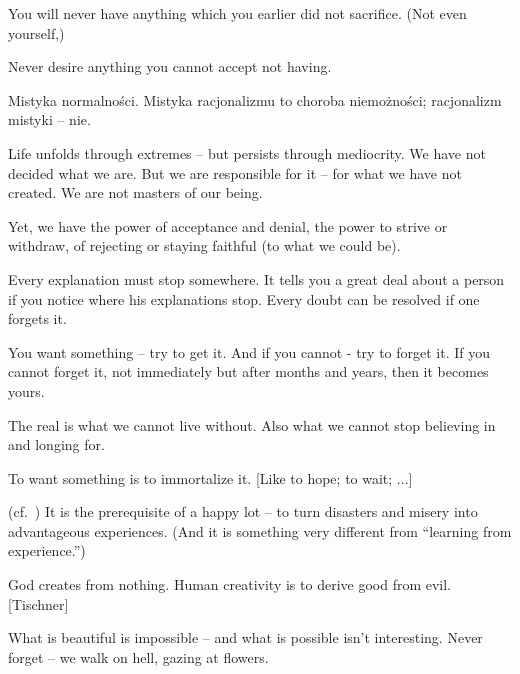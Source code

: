 
\pa
You will never have anything which you earlier did not sacrifice. (Not 
even yourself,)

Never desire anything you cannot accept not having.

\pa
Mistyka normalno\'sci. Mistyka racjonalizmu to choroba
niemo\.zno\'sci; racjonalizm mistyki -- nie.


\pa
Life unfolds through extremes -- but persists through mediocrity.
\pa
We have not decided what we are. But we are responsible for it -- for
what we have not created.
\pa
We are not masters of our being.

Yet, we have the power of acceptance and denial, the power to strive
or withdraw, of rejecting or staying faithful (to what we could be).

\pa
Every explanation must stop somewhere. It tells you a great deal about a person if you notice where his explanations stop.
\pa
Every doubt can be resolved if one forgets it.

\pa
You want something -- try to get it. And if you cannot - try to forget
it. If you cannot forget it, not immediately but after months and
years, then it becomes yours.

The real is what we cannot live without. Also what we cannot stop
believing in and longing for.


\pa
To want something is to immortalize it. [Like to hope; to wait; ...]


\pa\label{happylot} (cf.~)
It is the prerequisite of a happy lot -- to turn disasters and misery
into advantageous experiences. (And it is something very different from
``learning from experience.'') 

\pa\label{goodevil}
God creates from nothing. 
Human creativity is to derive good from evil. [Tischner]

\qpa
{What is beautiful is impossible -- and what is possible isn't interesting.}
\pa
Never forget -- we walk on hell, gazing at flowers.

